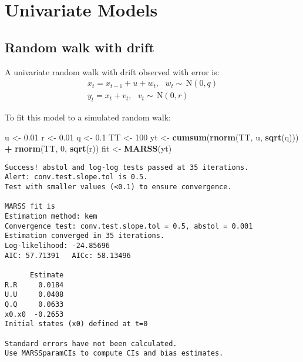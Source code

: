 \documentclass[12pt,]{book}
\newenvironment{Shaded}{\begin{snugshade}}{\end{snugshade}}
\newcommand{\DecValTok}[1]{\textcolor[rgb]{0.00,0.00,0.81}{#1}}
\newcommand{\FloatTok}[1]{\textcolor[rgb]{0.00,0.00,0.81}{#1}}
\newcommand{\KeywordTok}[1]{\textcolor[rgb]{0.13,0.29,0.53}{\textbf{#1}}}
\newcommand{\NormalTok}[1]{#1}
\newcommand{\OperatorTok}[1]{\textcolor[rgb]{0.81,0.36,0.00}{\textbf{#1}}}
\newcommand{\StringTok}[1]{\textcolor[rgb]{0.31,0.60,0.02}{#1}}
\begin{document}
\hypertarget{univariate-models}{%
\chapter{Univariate Models}\label{univariate-models}}

\hypertarget{random-walk-with-drift}{%
\section{Random walk with drift}\label{random-walk-with-drift}}

A univariate random walk with drift observed with error is:
\begin{gather}
x_{t} = x_{t-1} + u + w_{t}, \text{ } w_t \sim \,\text{N}(0,q)  \\
y_{t} = x_{t} + v_{t}, \text{ } v_t \sim \,\text{N}(0,r)
\end{gather}

To fit this model to a simulated random walk: 

\begin{Shaded}
\begin{Highlighting}[]
\NormalTok{u <-}\StringTok{ }\FloatTok{0.01}
\NormalTok{r <-}\StringTok{ }\FloatTok{0.01}
\NormalTok{q <-}\StringTok{ }\FloatTok{0.1}
\NormalTok{TT <-}\StringTok{ }\DecValTok{100}
\NormalTok{yt <-}\StringTok{ }\KeywordTok{cumsum}\NormalTok{(}\KeywordTok{rnorm}\NormalTok{(TT, u, }\KeywordTok{sqrt}\NormalTok{(q))) }\OperatorTok{+}\StringTok{ }\KeywordTok{rnorm}\NormalTok{(TT, }\DecValTok{0}\NormalTok{, }\KeywordTok{sqrt}\NormalTok{(r))}
\NormalTok{fit <-}\StringTok{ }\KeywordTok{MARSS}\NormalTok{(yt)}
\end{Highlighting}
\end{Shaded}

\begin{verbatim}
Success! abstol and log-log tests passed at 35 iterations.
Alert: conv.test.slope.tol is 0.5.
Test with smaller values (<0.1) to ensure convergence.

MARSS fit is
Estimation method: kem 
Convergence test: conv.test.slope.tol = 0.5, abstol = 0.001
Estimation converged in 35 iterations. 
Log-likelihood: -24.85696 
AIC: 57.71391   AICc: 58.13496   
 
      Estimate
R.R     0.0184
U.U     0.0408
Q.Q     0.0633
x0.x0  -0.2653
Initial states (x0) defined at t=0

Standard errors have not been calculated. 
Use MARSSparamCIs to compute CIs and bias estimates.
\end{verbatim}
\end{document}
